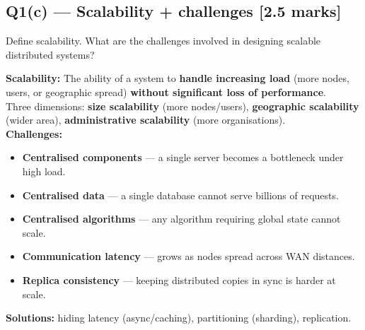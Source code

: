\documentclass[12pt, a4paper]{article}
\newenvironment{qbox}{\begin{mdframed}[style=qframe]}{\end{mdframed}}
\newenvironment{solbox}{\begin{mdframed}[style=solframe]}{\end{mdframed}}
\newcommand{\qmarks}[1]{\hfill\textbf{\color{orange!70!black}[#1 marks]}}
\begin{document}
\subsection{Q1(c) — Scalability + challenges \texorpdfstring{\qmarks{2.5}}{}}
\begin{qbox}Define scalability. What are the challenges involved in designing scalable distributed systems?\end{qbox}
\begin{solbox}
\textbf{Scalability:} The ability of a system to \textbf{handle increasing load} (more nodes, users, or geographic spread) \textbf{without significant loss of performance}.\\
Three dimensions: \textbf{size scalability} (more nodes/users), \textbf{geographic scalability} (wider area), \textbf{administrative scalability} (more organisations).\\[4pt]
\textbf{Challenges:}
\begin{itemize}[leftmargin=1.4cm, itemsep=2pt]
  \item \textbf{Centralised components} — a single server becomes a bottleneck under high load.
  \item \textbf{Centralised data} — a single database cannot serve billions of requests.
  \item \textbf{Centralised algorithms} — any algorithm requiring global state cannot scale.
  \item \textbf{Communication latency} — grows as nodes spread across WAN distances.
  \item \textbf{Replica consistency} — keeping distributed copies in sync is harder at scale.
\end{itemize}
\textbf{Solutions:} hiding latency (async/caching), partitioning (sharding), replication.
\end{solbox}

\end{document}
